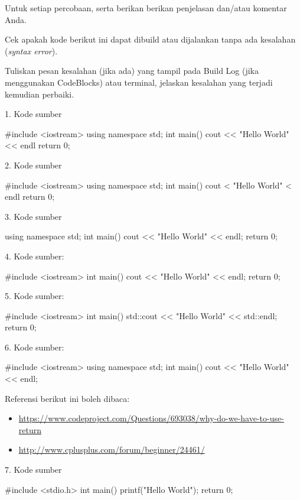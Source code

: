 \documentclass[a4paper,11pt]{extarticle}
\begin{document}
Untuk setiap percobaan, 
serta berikan berikan penjelasan dan/atau komentar Anda.

Cek apakah kode berikut ini dapat dibuild atau dijalankan tanpa
ada kesalahan (\textit{syntax error}).

Tuliskan pesan kesalahan (jika ada) yang tampil pada Build Log
(jika menggunakan CodeBlocks) atau terminal, jelaskan kesalahan
yang terjadi kemudian perbaiki.

1. Kode sumber
\begin{cppcode}
#include <iostream>
using namespace std;
int main()
{
  cout << "Hello World" << endl
  return 0;
}
\end{cppcode}

2. Kode sumber
\begin{cppcode}
#include <iostream>
using namespace std;
int main()
{
  cout < "Hello World" < endl
  return 0;
}
\end{cppcode}

3. Kode sumber
\begin{cppcode}
using namespace std;
int main()
{
  cout << "Hello World" << endl;
  return 0;
}
\end{cppcode}


4. Kode sumber:
\begin{cppcode}
#include <iostream>
int main()
{
  cout << "Hello World" << endl;
  return 0;
}
\end{cppcode}

5. Kode sumber:
\begin{cppcode}
#include <iostream>
int main()
{
  std::cout << "Hello World" << std::endl;
  return 0;
}
\end{cppcode}


6. Kode sumber:
\begin{cppcode}
#include <iostream>
using namespace std;
int main()
{
  cout << "Hello World" << endl;
}
\end{cppcode}

Referensi berikut ini boleh dibaca:
\begin{itemize}
\item \url{https://www.codeproject.com/Questions/693038/why-do-we-have-to-use-return}
\item \url{http://www.cplusplus.com/forum/beginner/24461/}
\end{itemize}

7. Kode sumber
\begin{cppcode}
#include <stdio.h>
int main()
{
  printf("Hello World\n");
  return 0;
}
\end{cppcode}
\end{document}
